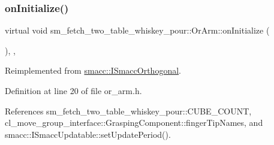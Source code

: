 \subsubsection{\texorpdfstring{on\+Initialize()}{onInitialize()}}
{\footnotesize\ttfamily virtual void sm\+\_\+fetch\+\_\+two\+\_\+table\+\_\+whiskey\+\_\+pour\+::\+Or\+Arm\+::on\+Initialize (\begin{DoxyParamCaption}{ }\end{DoxyParamCaption})\hspace{0.3cm}{\ttfamily [inline]}, {\ttfamily [override]}, {\ttfamily [virtual]}}



Reimplemented from \hyperlink{classsmacc_1_1ISmaccOrthogonal_a6bb31c620cb64dd7b8417f8705c79c7a}{smacc\+::\+I\+Smacc\+Orthogonal}.



Definition at line 20 of file or\+\_\+arm.\+h.



References sm\+\_\+fetch\+\_\+two\+\_\+table\+\_\+whiskey\+\_\+pour\+::\+C\+U\+B\+E\+\_\+\+C\+O\+U\+NT, cl\+\_\+move\+\_\+group\+\_\+interface\+::\+Grasping\+Component\+::finger\+Tip\+Names, and smacc\+::\+I\+Smacc\+Updatable\+::set\+Update\+Period().


